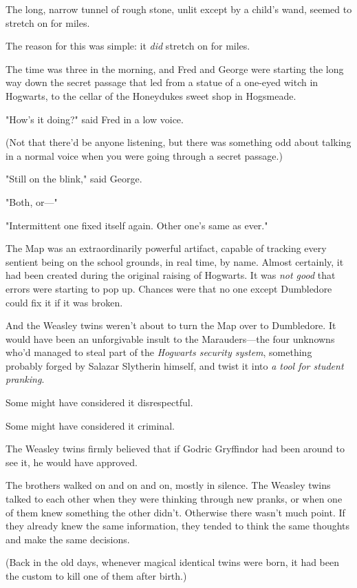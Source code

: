 The long, narrow tunnel of rough stone, unlit except by a child's wand, seemed
to stretch on for miles.

The reason for this was simple: it \emph{did} stretch on for miles.

The time was three in the morning, and Fred and George were starting the long
way down the secret passage that led from a statue of a one-eyed witch in
Hogwarts, to the cellar of the Honeydukes sweet shop in Hogsmeade.

"How's it doing?" said Fred in a low voice.

(Not that there'd be anyone listening, but there was something odd about
talking in a normal voice when you were going through a secret passage.)

"Still on the blink," said George.

"Both, or---"

"Intermittent one fixed itself again. Other one's same as ever."

The Map was an extraordinarily powerful artifact, capable of tracking every
sentient being on the school grounds, in real time, by name. Almost certainly,
it had been created during the original raising of Hogwarts. It was \emph{not
good} that errors were starting to pop up. Chances were that no one except
Dumbledore could fix it if it was broken.

And the Weasley twins weren't about to turn the Map over to Dumbledore. It
would have been an unforgivable insult to the Marauders---the four unknowns
who'd managed to steal part of the \emph{Hogwarts security system}, something
probably forged by Salazar Slytherin himself, and twist it into \emph{a tool
for student pranking}.

Some might have considered it disrespectful.

Some might have considered it criminal.

The Weasley twins firmly believed that if Godric Gryffindor had been around to
see it, he would have approved.

The brothers walked on and on and on, mostly in silence. The Weasley twins
talked to each other when they were thinking through new pranks, or when one of
them knew something the other didn't. Otherwise there wasn't much point. If
they already knew the same information, they tended to think the same thoughts
and make the same decisions.

(Back in the old days, whenever magical identical twins were born, it had been
the custom to kill one of them after birth.)

